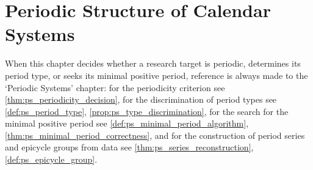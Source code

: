 \chapter{Periodic Structure of Calendar Systems}
\label{chap:calendar-periodic}

\begin{remark}\label{rem:calendar_ps_hook}
When this chapter decides whether a research target is periodic, determines its period type, or seeks its minimal positive period, reference is always made to the `Periodic Systems' chapter:
for the periodicity criterion see \cref{thm:ps_periodicity_decision},
for the discrimination of period types see \cref{def:ps_period_type}, \cref{prop:ps_type_discrimination},
for the search for the minimal positive period see \cref{def:ps_minimal_period_algorithm}, \cref{thm:ps_minimal_period_correctness},
and for the construction of period series and epicycle groups from data see \cref{thm:ps_series_reconstruction}, \cref{def:ps_epicycle_group}.
\end{remark}

